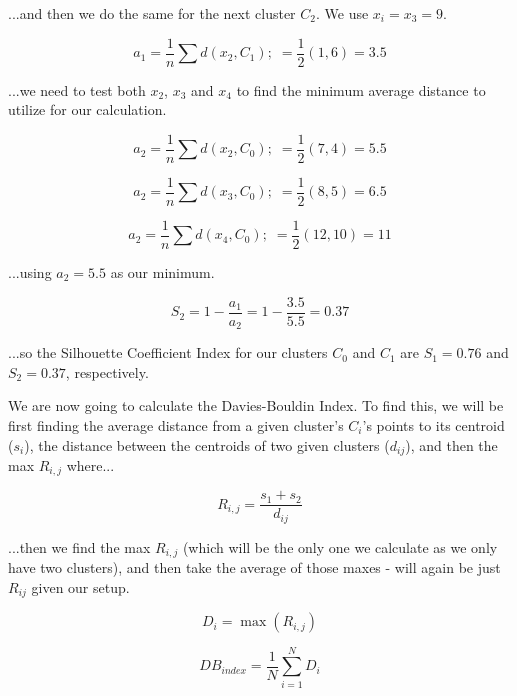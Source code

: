 \documentclass{article}
\begin{document}
\noindent ...and then we do the same for the next cluster $C_2$. We use $x_i=x_3=9$.

\begin{equation}
    a_1 = \frac{1}{n} \sum d(x_2, C_1); \; = \frac{1}{2} (1, 6) = 3.5
\end{equation}

\noindent ...we need to test both $x_2$, $x_3$ and $x_4$ to find the minimum average distance to utilize for our calculation.

\begin{equation}
    a_2 = \frac{1}{n} \sum d(x_2, C_0); \; = \frac{1}{2} (7, 4) = 5.5
\end{equation}

\begin{equation}
    a_2 = \frac{1}{n} \sum d(x_3, C_0); \; = \frac{1}{2} (8, 5) = 6.5
\end{equation}

\begin{equation}
    a_2 = \frac{1}{n} \sum d(x_4, C_0); \; = \frac{1}{2} (12, 10) = 11
\end{equation}

\noindent ...using $a_2=5.5$ as our minimum.

\begin{equation}
    S_2 = 1- \frac{a_1}{a_2} = 1 - \frac{3.5}{5.5} = 0.37
\end{equation}

\noindent ...so the Silhouette Coefficient Index for our clusters $C_0$ and $C_1$ are $S_1=0.76$ and $S_2=0.37$, respectively.

We are now going to calculate the Davies-Bouldin Index. To find this, we will be first finding the average distance from a given cluster's $C_i$'s points to its centroid ($s_i$), the distance between the centroids of two given clusters ($d_{ij}$), and then the max $R_{i,j}$ where...

\begin{equation}
    R_{i,j} = \frac{s_1+s_2}{d_{ij}}
\end{equation}

\noindent ...then we find the max $R_{i,j}$ (which will be the only one we calculate as we only have two clusters), and then take the average of those maxes - will again be just $R_{ij}$ given our setup.

\begin{equation}
    D_i = \max(R_{i,j})
\end{equation}

\begin{equation}
    DB_{index} = \frac{1}{N} \sum^N_{i=1} D_i
\end{equation}
\end{document}
